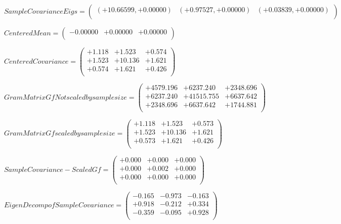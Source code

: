 \documentclass[9pt]{article}
\theoremstyle{plain}
\theoremstyle{definition}
\theoremstyle{remark}
\numberwithin{equation}{section}
\begin{document}
$Sample Covariance Eigs = \left(
\begin{array}{
ccc}
(+10.66599,+0.00000) & (+0.97527,+0.00000) & (+0.03839,+0.00000) \\
\end{array}
\right)$ \newline 

$Centered Mean = \left(
\begin{array}{
ccc}
-0.00000 & +0.00000 & +0.00000 \\
\end{array}
\right)$ \newline 

$Centered Covariance = \left(
\begin{array}{
ccc}
+1.118 & +1.523 & +0.574 \\
+1.523 & +10.136 & +1.621 \\
+0.574 & +1.621 & +0.426 \\
\end{array}
\right)$ \newline 

$Gram Matrix Gf Not scaled by sample size = \left(
\begin{array}{
ccc}
+4579.196 & +6237.240 & +2348.696 \\
+6237.240 & +41515.755 & +6637.642 \\
+2348.696 & +6637.642 & +1744.881 \\
\end{array}
\right)$ \newline 

$Gram Matrix Gf  scaled by sample size = \left(
\begin{array}{
ccc}
+1.118 & +1.523 & +0.573 \\
+1.523 & +10.136 & +1.621 \\
+0.573 & +1.621 & +0.426 \\
\end{array}
\right)$ \newline 

$SampleCovariance - Scaled Gf = \left(
\begin{array}{
ccc}
+0.000 & +0.000 & +0.000 \\
+0.000 & +0.002 & +0.000 \\
+0.000 & +0.000 & +0.000 \\
\end{array}
\right)$ \newline 

$EigenDecomp of SampleCovariance = \left(
\begin{array}{
ccc}
-0.165 & -0.973 & -0.163 \\
+0.918 & -0.212 & +0.334 \\
-0.359 & -0.095 & +0.928 \\
\end{array}
\right)$ \newline 
\end{document}

